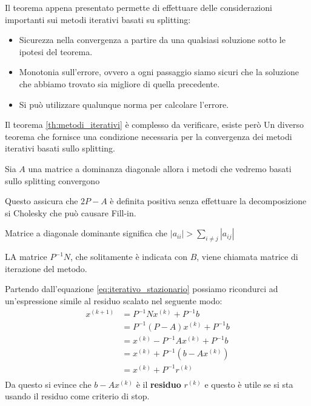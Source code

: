 Il teorema appena presentato permette di effettuare delle considerazioni importanti
sui metodi iterativi basati su splitting:
\begin{itemize}
    \item Sicurezza nella convergenza a partire da una qualsiasi soluzione sotto
          le ipotesi del teorema.
    \item Monotonia sull'errore, ovvero a ogni passaggio siamo sicuri che la
          soluzione che abbiamo trovato sia migliore di quella precedente.
    \item Si può utilizzare qualunque norma per calcolare l'errore.
\end{itemize}
Il teorema \ref{th:metodi_iterativi} è complesso da verificare, esiste però Un
diverso teorema che fornisce una condizione necessaria per la convergenza dei
metodi iterativi basati sullo splitting.
\begin{teorema}
    Sia $A$ una matrice a dominanza diagonale allora i metodi che vedremo basati
    sullo splitting convergono
\end{teorema}
Questo assicura che $2P - A$ è definita positiva senza effettuare la decomposizione
si Cholesky che può causare Fill-in.
\begin{nota}
    Matrice a diagonale dominante significa che $|a_{ii}| > \sum_{i \neq j}|a_{ij}|$
\end{nota}
\begin{definizione}
    LA matrice $P^{-1}N$, che solitamente è indicata con $B$, viene chiamata matrice
    di iterazione del metodo.
\end{definizione}
Partendo dall'equazione \ref{eq:iterativo_stazionario} possiamo ricondurci ad
un'espressione simile al residuo scalato nel seguente modo:
\begin{equation*}
    \begin{aligned}
        x^{(k + 1)} & = P^{-1}Nx^{(k)} + P^{-1}b           \\
                    & = P^{-1}(P - A)x^{(k)} + P^{-1}b     \\
                    & = x^{(k)} - P^{-1}Ax^{(k)} + P^{-1}b \\
                    & = x^{(k)} + P^{-1}(b - Ax^{(k)})     \\
                    & = x^{(k)} + P^{-1}r^{(k)}            \\
    \end{aligned}
\end{equation*}
Da questo si evince che $b-Ax^{(k)}$ è il \textbf{residuo} $r^{(k)}$ e questo è
utile se si sta usando il residuo come criterio di stop.
